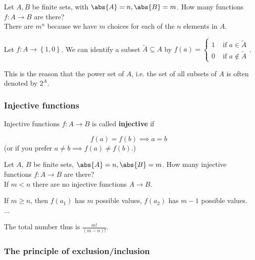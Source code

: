 \documentclass[english]{lbscript}
\begin{document}
\begin{proposition}{}{}
	Let \(A, B\) be finite sets, with \(\abs{A}=n, \abs{B}=m\). How many functions \(f:A→B\) are there?\\
	There are \(m^{n}\) because we have \(m\) choices for each of the \(n\) elements in \(A\).
\end{proposition}

\begin{remark}{}{}
	Let \(f: A → \left\{ 1, 0 \right\} \). We can identify a subset \(\tilde{A}⊆A\) by \(f(a) = \begin{cases} 1 & \text{ if } a∈\tilde{A} \\ 0 & \text{ if } a ∉ \tilde{A} \end{cases}\).

	This is the reason that the power set of \(A\), i.e. the set of all subsets of \(A\) is often denoted by \(2^{A}\).
\end{remark}

\subsubsection{Injective functions}
\label{sec:injective-functions}

\begin{definition}{Injective functions}{}
	\(f:A→B\) is called \textbf{injective} if

	\begin{equation}
		\label{eq:6}
		f(a)=f(b)⟹ a=b
	\end{equation}
	(or if you prefer \(a≠b⟹f(a)≠f(b)\).)
\end{definition}

\begin{proposition}{}{}
	Let \(A\), \(B\) be finite sets, \(\abs{A}=n, \abs{B}=m\). How many injective functions \(f:A→B\) are there?\\

	If \(m<n\) there are no injective functions \(A→B\).

	If \(m≥n\), then \(f(a_1)\) has \(m\) possible values, \(f(a_2)\) has \(m-1\) possible values. ...

	The total number thus is \(\frac{m!}{(m-n)!}\).
\end{proposition}

\subsubsection{The principle of exclusion/inclusion}
\label{sec:princ-excl}
\end{document}
